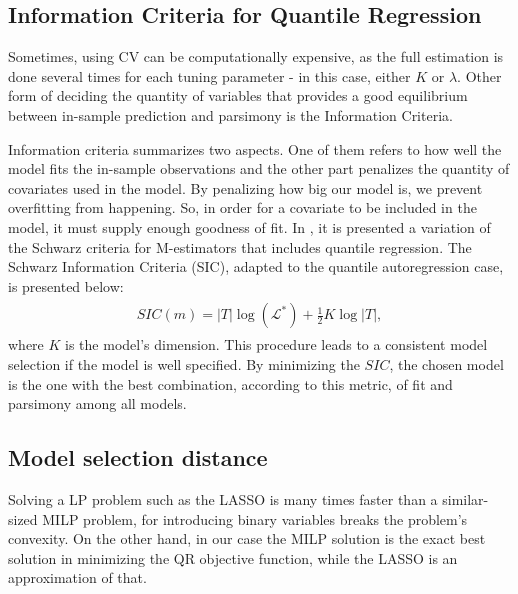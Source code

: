 \subsection{Information Criteria for Quantile Regression}
Sometimes, using CV can be computationally expensive, as the full estimation is done several times for each tuning parameter - in this case, either $K$ or $\lambda$. Other form of deciding the quantity of variables that provides a good equilibrium between in-sample prediction and parsimony is the Information Criteria.

Information criteria summarizes two aspects. One of them refers to how well the model fits the in-sample observations and the other part penalizes the quantity of covariates used in the model. By penalizing how big our model is, we prevent overfitting from happening. So, in order for a covariate to be included in the model, it must supply enough goodness of fit.
In \cite{machado1993robust}, it is presented a variation of the Schwarz criteria for M-estimators that includes quantile regression. The Schwarz Information Criteria (SIC), adapted to the quantile autoregression case, is presented below:
\begin{align} 
\begin{split}
SIC(m) = |T| \log(\mathcal{L}^*)+\frac{1}{2}K\log |T|,\label{eq:SIC}
\end{split}					
\end{align}
where $K$ is the model's dimension. This procedure leads to a consistent model selection if the model is well specified. 
By minimizing the $SIC$, the chosen model is the one with the best combination, according to this metric, of fit and parsimony among all models. 

\subsection{Model selection distance}
%


Solving a LP problem such as the LASSO is many times faster than a similar-sized MILP problem, for introducing binary variables breaks the problem's convexity. On the other hand, in our case the MILP solution is the exact best solution in minimizing the QR objective function, while the LASSO is an approximation of that.

